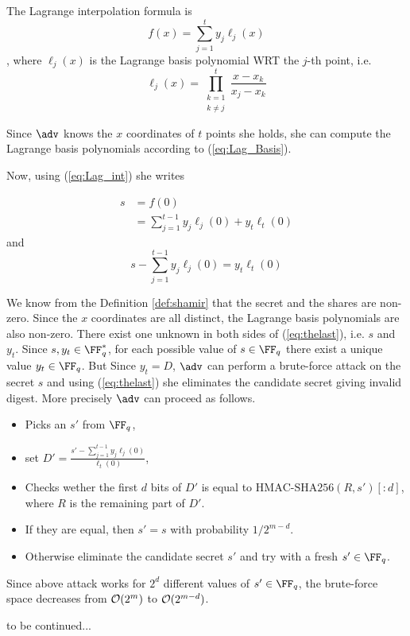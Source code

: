 \documentclass[envcountsame,runningheads,notitlepage]{llncs}
\begin{document}
	The Lagrange interpolation formula is
		\begin{equation}\label{eq:Lag_int}
		f(x) = \sum\limits_{j = 1}^{t} y_{j} \ell_{j}(x)
		\end{equation}
	, where $\ell_{j}(x)$ is the  Lagrange basis polynomial WRT the $j$-th point, i.e.
		\begin{equation}\label{eq:Lag_Basis}
		\ell_{j}(x) = \prod\limits_{\substack{k = 1 \\ k \neq j}}^{t} \frac{x - x_{k}}{x_{j} - x_{k}}
		\end{equation}
	
	Since $\adv$ knows the $x$ coordinates of $t$ points she holds, she can compute the Lagrange basis polynomials according to (\ref{eq:Lag_Basis}). 
	
	Now, using (\ref{eq:Lag_int}) she writes
	
	\begin{align*}
		s &= f(0)\\
		  &= \sum\limits_{j = 1}^{t-1} y_{j}\ell_{j}(0) + y_{t}\ell_{t}(0)
	\end{align*}
	and 
	\begin{equation}\label{eq:thelast}
		s - \sum\limits_{j = 1}^{t-1} y_{j}\ell_{j}(0) = y_{t}\ell_{t}(0)
	\end{equation}
	
	We know from the Definition \ref{def:shamir} that the secret and the shares are non-zero. Since the $x$ coordinates are all distinct, the Lagrange basis polynomials are also non-zero. There exist one unknown in both sides of (\ref{eq:thelast}), i.e. $s$ and $y_{t}$. Since $s, y_{t} \in \FF_q^{*}$, for each possible value of $s \in \FF_q$ there exist a unique value $y_{t} \in \FF_q$. But Since $y_{t} = D$, $\adv$ can perform a brute-force attack on the secret $s$ and using (\ref{eq:thelast}) she eliminates the candidate secret giving invalid digest. More precisely $\adv$ can proceed as follows.
		\begin{itemize}
			\item Picks an $s'$ from $\FF_q$,
			\item set $D' = \frac{s' - \sum\limits_{j = 1}^{t-1} y_{j}\ell_{j}(0)}{\ell_{t}(0)}$,
			\item Checks wether the first $d$ bits of $D'$ is equal to $\textrm{HMAC-SHA256}(R, s')[:d]$, where $R$ is the remaining part of $D'$.
			\item If they are equal, then $s' = s$ with probability $1/2^{m - d}$. 
			\item Otherwise eliminate the candidate secret $s'$ and try with a fresh $s' \in \FF_q$. 
		\end{itemize}
 Since above attack works for $2^{d}$ different values of $s' \in \FF_q$, the brute-force space decreases from ${\mathcal O}(2^{m})$ to ${\mathcal O}(2^{m - d})$. 
	
	to be continued...
	
%

\ifnum{}
  
 \else
   
 \fi

\end{document}
